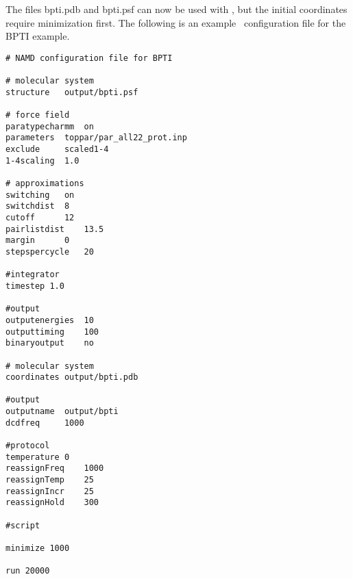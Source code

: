 The files bpti.pdb and bpti.psf can now be used with \NAMD, but the
initial coordinates require minimization first.
The following is an example \NAMD\ configuration file for the BPTI example.

\newpage
\begin{verbatim}
# NAMD configuration file for BPTI

# molecular system
structure	output/bpti.psf

# force field
paratypecharmm	on
parameters	toppar/par_all22_prot.inp
exclude		scaled1-4
1-4scaling	1.0

# approximations
switching	on
switchdist	8
cutoff		12
pairlistdist	13.5
margin		0
stepspercycle	20

#integrator
timestep 1.0

#output
outputenergies	10
outputtiming	100
binaryoutput	no

# molecular system
coordinates	output/bpti.pdb

#output
outputname	output/bpti
dcdfreq		1000

#protocol
temperature	0
reassignFreq	1000
reassignTemp	25
reassignIncr	25
reassignHold	300

#script

minimize 1000

run 20000
\end{verbatim}

 
